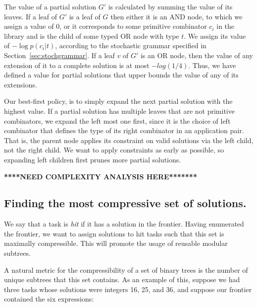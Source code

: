 \documentclass{article}
\begin{document}
The value of a partial solution $G'$ is calculated by summing the
value of its leaves. If a leaf of $G'$ is a leaf of $G$ then either it
is an AND node, to which we assign a value of 0, or it corresponds to
some primitive combinator $c_i$ in the library and is the child of
some typed OR node with type $t$. We assign its value of $- \log{p(c_i
  | t)}$, according to the stochastic grammar specified in
Section~\ref{sec:stochgrammar}. If a leaf $v$ of $G'$ is an OR node,
then the value of any extension of it to a complete solution is at
most $-log(1/4)$. Thus, we have defined a value for partial solutions
that upper bounds the value of any of its extensions. 

Our best-first policy, is to simply expand the next partial solution
with the highest value. If a partial solution has multiple leaves that
are not primitive combinators, we expand the left most one first,
since it is the choice of left combinator that defines the type of its
right combinator in an application pair. That is, the parent node
applies its constraint on valid solutions via the left child, not the
right child. We want to apply constraints as early as possible, so
expanding left children first prunes more partial solutions.

\textbf{****NEED COMPLEXITY ANALYSIS HERE*******}

\subsection{Finding the most compressive set of solutions.}

We say that a task is \emph{hit} if it has a solution in the
frontier. Having enumerated the frontier, we want to assign solutions
to hit tasks such that this set is maximally compressible. This will
promote the usage of reusable modular subtrees. 

A natural metric for the compressibility of a set of binary trees is
the number of unique subtrees that this set contains. As an example of
this, suppose we had three tasks whose solutions were integers 16, 25,
and 36, and suppose our frontier contained the six expressions:

\end{document}
